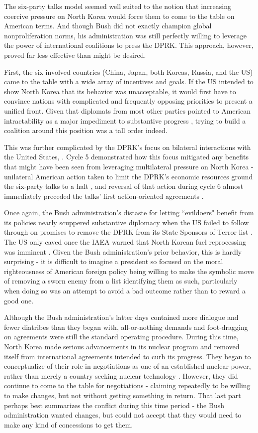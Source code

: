 \documentclass{article}
\begin{document}
The six-party talks model seemed well suited to the notion that increasing coercive pressure on North Korea would force them to come to the table on American terms. And though Bush did not exactly champion global nonproliferation norms, his administration was still perfectly willing to leverage the power of international coalitions to press the DPRK. This approach, however, proved far less effective than might be desired.

First, the six involved countries (China, Japan, both Koreas, Russia, and the US) came to the table with a wide array of incentives and goals. If the US intended to show North Korea that its behavior was unacceptable, it would first have to convince nations with complicated and frequently opposing priorities to present a unified front. Given that diplomats from most other parties pointed to American intractability as a major impediment to substantive progress \cite{park6pt}, trying to build a coalition around this position was a tall order indeed.

This was further complicated by the DPRK's focus on bilateral interactions with the United States, \cite{rich14,park6pt}. Cycle 5 demonstrated how this focus mitigated any benefits that might have been seen from leveraging multilateral pressure on North Korea - unilateral American action taken to limit the DPRK's economic resources ground the six-party talks to a halt \cite{greenlees}, and reversal of that action during cycle 6 almost immediately preceded the talks' first action-oriented agreements \cite{js5,js6}. 

Once again, the Bush administration's distaste for letting ``evildoers" benefit from its policies nearly scuppered substantive diplomacy when the US failed to follow through on promises to remove the DPRK from its State Sponsors of Terror list \cite{nti15}. The US only caved once the IAEA warned that North Korean fuel reprocessing was imminent \cite{iaea09}. Given the Bush administration's prior behavior, this is hardly surprising - it is difficult to imagine a president so focused on the moral righteousness of American foreign policy being willing to make the symbolic move of removing a sworn enemy from a list identifying them as such, particularly when doing so was an attempt to avoid a bad outcome rather than to reward a good one.

Although the Bush administration's latter days contained more dialogue and fewer diatribes than they began with, all-or-nothing demands and foot-dragging on agreements were still the standard operating procedure. During this time, North Korea made serious advancements in its nuclear program and removed itself from international agreements intended to curb its progress. They began to conceptualize of their role in negotiations as one of an established nuclear power, rather than merely a country seeking nuclear technology \cite{hecker2}. However, they did continue to come to the table for negotiations - claiming repeatedly to be willing to make changes, but not without getting something in return. That last part perhaps best summarizes the conflict during this time period - the Bush administration wanted changes, but could not accept that they would need to make any kind of concessions to get them.
\end{document}
